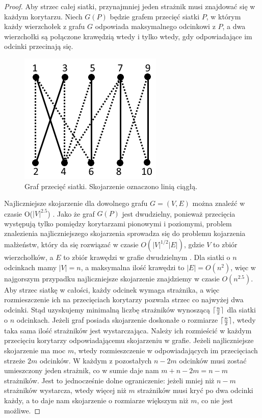 \documentclass{xmgr}
\DeclarePairedDelimiter\ceil{\lceil}{\rceil}
\theoremstyle{definition}
\begin{document}
\begin{proof}
Aby strzec całej siatki, przynajmniej jeden strażnik musi znajdować się w każdym korytarzu. Niech $G(P)$ będzie grafem przecięć siatki $P$, w którym każdy wierzchołek z grafu $G$ odpowiada maksymalnego odcinkowi z $P$, a dwa wierzchołki są połączone krawędzią wtedy i tylko wtedy, gdy odpowiadające im odcinki przecinają się.

 \begin{figure}[ht!]
   \centering
   \includegraphics{rysunki/graf_skojarzen.png}
   \caption{Graf przecięć siatki. Skojarzenie oznaczono linią ciągłą.}
   \label{fig:graf przeciec}
 \end{figure} 

 Najliczniejsze skojarzenie dla dowolnego grafu $G = (V,E)$ można znaleźć w czasie O($|V|^{2.5}$) \cite{even}. Jako że graf $G(P)$ jest dwudzielny, ponieważ przecięcia występują tylko pomiędzy korytarzami pionowymi i poziomymi, problem znalezienia najliczniejszego skojarzenia sprowadza się do problemu kojarzenia małżeństw, który da się rozwiązać w czasie $O(|V|^{1/2}|E|)$, gdzie $V$ to zbiór wierzchołków, a $E$ to zbiór krawędzi w grafie dwudzielnym \cite{even}. Dla siatki o $n$ odcinkach mamy $|V| = n$, a maksymalna ilość krawędzi to $|E| = O(n^2)$, więc w najgorszym przypadku najliczniejsze skojarzenie znajdziemy w czasie $O(n^{2.5})$.
 \\\indent Aby strzec siatkę w całości, każdy odcinek wymaga strażnika, a więc rozmieszczenie ich na przecięciach korytarzy pozwala strzec co najwyżej dwa odcinki. Stąd uzyskujemy minimalną liczbę strażników wynoszącą $\ceil{\frac{n}{2}}$ dla siatki o $n$ odcinkach. Jeżeli graf posiada skojarzenie doskonałe o rozmiarze $\ceil{\frac{n}{2}}$, wtedy taka sama ilość strażników jest wystarczająca. Należy ich rozmieścić w każdym przecięciu korytarzy odpowiadającemu skojarzeniu w grafie. Jeżeli najliczniejsze skojarzenie ma moc $m$, wtedy rozmieszczenie w odpowiadających im przecięciach strzeże $2m$ odcinków. W każdym z pozostałych $n-2m$ odcinków musi zostać umieszczony jeden strażnik, co w sumie daje nam $m + n-2m = n-m$ strażników. Jest to jednocześnie dolne ograniczenie: jeżeli mniej niż $n-m$ strażników wystarcza, wtedy więcej niż $m$ strażników musi kryć po dwa odcinki każdy, a to daje nam skojarzenie o rozmiarze większym niż $m$, co nie jest możliwe.
\end{proof}
\end{document}
